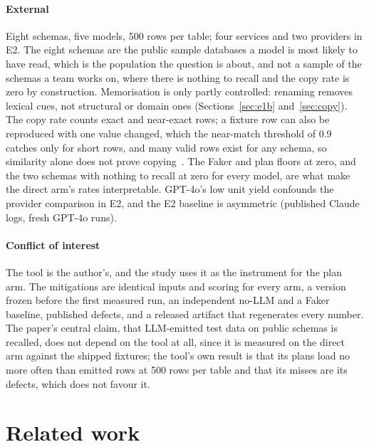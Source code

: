 \documentclass[preprint,12pt]{elsarticle}
\begin{document}
\paragraph{External} Eight schemas, five models, 500 rows per table; four services and two providers in E2. The eight schemas are the public sample databases a model is most likely to have read, which is the population the question is about, and not a sample of the schemas a team works on, where there is nothing to recall and the copy rate is zero by construction. Memorisation is only partly controlled: renaming removes lexical cues, not structural or domain ones (Sections~\ref{sec:e1b} and~\ref{sec:copy}). The copy rate counts exact and near-exact rows; a fixture row can also be reproduced with one value changed, which the near-match threshold of 0.9 catches only for short rows, and many valid rows exist for any schema, so similarity alone does not prove copying~\cite{riddell2024contamination}. The Faker and plan floors at zero, and the two schemas with nothing to recall at zero for every model, are what make the direct arm's rates interpretable. GPT-4o's low unit yield confounds the provider comparison in E2, and the E2 baseline is asymmetric (published Claude logs, fresh GPT-4o runs).
\paragraph{Conflict of interest} The tool is the author's, and the study uses it as the instrument for the plan arm. The mitigations are identical inputs and scoring for every arm, a version frozen before the first measured run, an independent no-LLM and a Faker baseline, published defects, and a released artifact that regenerates every number. The paper's central claim, that LLM-emitted test data on public schemas is recalled, does not depend on the tool at all, since it is measured on the direct arm against the shipped fixtures; the tool's own result is that its plans load no more often than emitted rows at 500 rows per table and that its misses are its defects, which does not favour it.

\section{Related work}
\label{sec:related}
\end{document}
